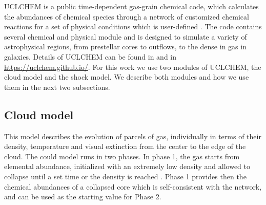 \documentclass{aa}
\begin{document}
\begin{CJK*}{UTF8}{gbsn}
   UCLCHEM is a public time-dependent gas-grain chemical code, which calculates the abundances of chemical species through a network of customized chemical reactions for a set of physical conditions which is user-defined \citep{holdship2017uclchem}. The code contains several chemical and physical module and is designed to simulate a variety of astrophysical regions, from prestellar cores to outflows, to the dense in gas in galaxies. Details of UCLCHEM can be found in \citep{holdship2017uclchem} and in \url{https://uclchem.github.io/}. 
  For this work we use two modules of UCLCHEM, the cloud model and the shock model. We describe both modules and how we use them in the next two subsections.  
\subsection{Cloud model}
   
   This model describes the evolution of parcels of gas, individually in terms of their density, temperature and visual extinction from the center to the edge of the cloud. 
   The could model runs in two phases. 
   In phase 1, the gas starts from elemental abundance, initialized with an extremely low density and allowed to collapse until a set time or the density is reached \citep{holdship2017uclchem}.
   Phase 1 provides then the chemical abundances of a collapsed core which is self-consistent with the network, and can be used as the starting value for Phase 2.
   

\end{CJK*}
\end{document}
